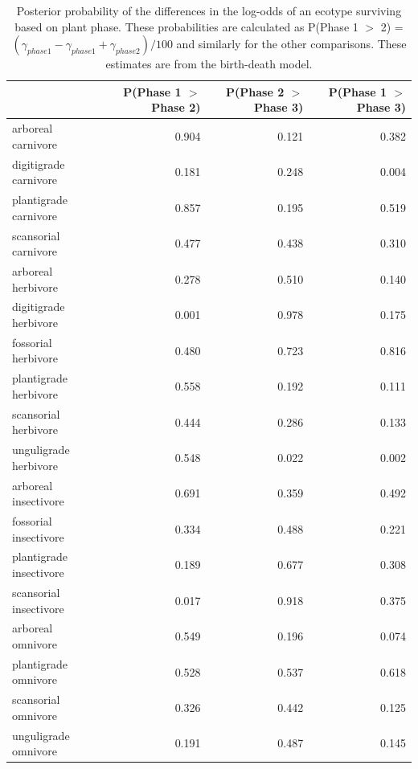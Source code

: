 \documentclass[12pt,letterpaper]{article}
\begin{document}
\begin{table}[ht]
  \centering
  \caption[Posterior probablity estimates of differences in survival by plant phase]{Posterior probability of the differences in the log-odds of an ecotype surviving based on plant phase. These probabilities are calculated as P(Phase 1 \(>\) 2) = \( (\gamma_{phase 1} - \gamma_{phase 1} + \gamma_{phase 2}) / 100\) and similarly for the other comparisons. These estimates are from the birth-death model.}
  \label{tab:surv_plant}
  \begin{tabular}{ l r r r }
    \hline
    & P(Phase 1 $>$ Phase 2) & P(Phase 2 $>$ Phase 3) & P(Phase 1 $>$ Phase 3) \\ 
    \hline
    arboreal carnivore & 0.904 & 0.121 & 0.382 \\ 
    digitigrade carnivore & 0.181 & 0.248 & 0.004 \\ 
    plantigrade carnivore & 0.857 & 0.195 & 0.519 \\ 
    scansorial carnivore & 0.477 & 0.438 & 0.310 \\ 
    arboreal herbivore & 0.278 & 0.510 & 0.140 \\ 
    digitigrade herbivore & 0.001 & 0.978 & 0.175 \\ 
    fossorial herbivore & 0.480 & 0.723 & 0.816 \\ 
    plantigrade herbivore & 0.558 & 0.192 & 0.111 \\ 
    scansorial herbivore & 0.444 & 0.286 & 0.133 \\ 
    unguligrade herbivore & 0.548 & 0.022 & 0.002 \\ 
    arboreal insectivore & 0.691 & 0.359 & 0.492 \\ 
    fossorial insectivore & 0.334 & 0.488 & 0.221 \\ 
    plantigrade insectivore & 0.189 & 0.677 & 0.308 \\ 
    scansorial insectivore & 0.017 & 0.918 & 0.375 \\ 
    arboreal omnivore & 0.549 & 0.196 & 0.074 \\ 
    plantigrade omnivore & 0.528 & 0.537 & 0.618 \\ 
    scansorial omnivore & 0.326 & 0.442 & 0.125 \\ 
    unguligrade omnivore & 0.191 & 0.487 & 0.145 \\ 
    \hline
  \end{tabular}
\end{table}
\end{document}
